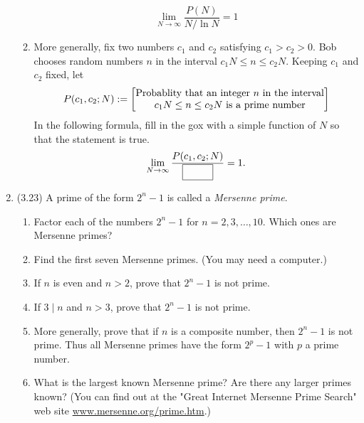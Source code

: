 \documentclass[12pt]{amsart}
\theoremstyle{definition}
\begin{document}
\begin{enumerate}
\begin{enumerate}
\begin{displaymath}
				\lim_{N \to \infty} \frac{P(N)}{N/\ln N} = 1
			\end{displaymath}
			\item More generally, fix two numbers $c_1$ and $c_2$ satisfying $c_1 > 
				c_2 > 0$. Bob chooses random numbers $n$ in the interval 
				$c_1 N \leq n \leq c_2 N$. Keeping $c_1$ and $c_2$ fixed, let 
			\begin{displaymath}
				P(c_1,c_2;N) := \left[\Centerstack{\text{Probablity that an integer 
					$n$ in the interval} \newline \text{$c_1N \leq n \leq 
					c_2 N$ is a prime number}}\right]
			\end{displaymath}
			In the following formula, fill in the gox with a simple function of $N$ 
			so that the statement is true. 
			\begin{displaymath}
				\lim_{N \to \infty} \frac{P(c_1,c_2;N)}{\framebox(3em,1.5em){}} = 1. 
			\end{displaymath}
		\end{enumerate}
	\item (3.23) A prime of the form $2^n-1$ is called a \textit{Mersenne prime}. 
		\begin{enumerate}
			\item Factor each of the numbers $2^n-1$ for $n=2,3,\ldots,10$. Which ones 
				are Mersenne primes?
			\item Find the first seven Mersenne primes. (You may need a computer.)
			\item If $n$ is even and $n > 2$, prove that $2^n-1$ is not prime.
			\item If $3 \mid n$ and $n > 3$, prove that $2^n-1$ is not prime.
			\item More generally, prove that if $n$ is a composite number, then 
				$2^n-1$ is not prime. Thus all Mersenne primes have the form 
				$2^p-1$ with $p$ a prime number. 
			\item What is the largest known Mersenne prime? Are there any larger 
				primes known? (You can find out at the "Great Internet Mersenne 
				Prime Search" web site \url{www.mersenne.org/prime.htm}.)
		\end{enumerate}
			
			
\end{enumerate}
\end{document}
